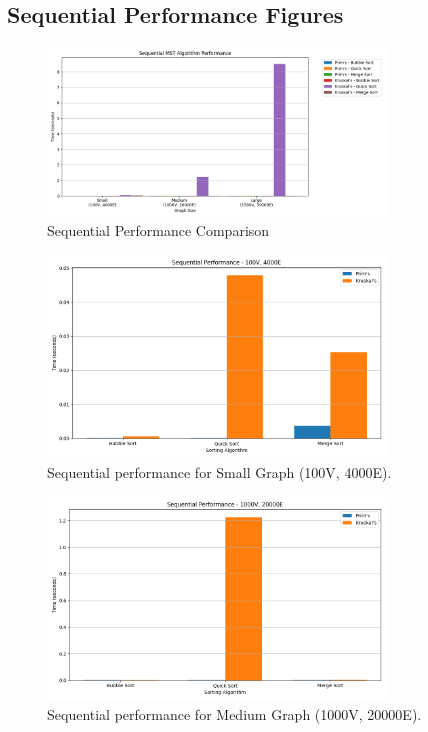 \documentclass[11pt]{article}
\begin{document}
\subsection{Sequential Performance Figures}
\begin{figure}[H]
    \centering
    \includegraphics[width=0.8\textwidth]{sequential_comparison}
    \caption{Sequential Performance Comparison}
    \label{fig:sequential_comparison}
\end{figure}

\begin{figure}[H]
    \centering
    \includegraphics[width=0.8\textwidth]{sequential_small}
    \caption{Sequential performance for Small Graph (100V, 4000E).}
    \label{fig:sequential_small}
\end{figure}

\begin{figure}[H]
    \centering
    \includegraphics[width=0.8\textwidth]{sequential_medium}
    \caption{Sequential performance for Medium Graph (1000V, 20000E).}
    \label{fig:sequential_medium}
\end{figure}
\end{document}
